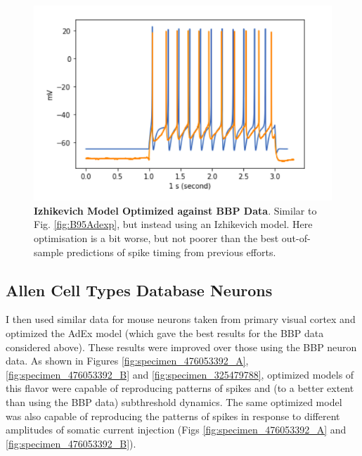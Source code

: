 \begin{figure}
    \centering
    \includegraphics{figures/IZHI_B95.png}
    \caption[Optimized Izhikevich Model from BBP]{\textbf{Izhikevich Model Optimized against BBP Data}. Similar to Fig. \ref{fig:B95Adexp}, but instead using an Izhikevich model.
    Here optimisation is a bit worse, but not poorer than the best out-of-sample predictions of spike timing from previous efforts.}
    \label{fig:B95_IZHI}
\end{figure}

\subsection{Allen Cell Types Database Neurons}
I then used similar data for mouse neurons taken from primary visual cortex and optimized the AdEx model (which gave the best results for the BBP data considered above).
These results were improved over those using the BBP neuron data.
As shown in Figures \ref{fig:specimen_476053392_A}, \ref{fig:specimen_476053392_B} and \ref{fig:specimen_325479788}, optimized models of this flavor were capable of reproducing patterns of spikes and (to a better extent than using the BBP data) subthreshold dynamics.
The same optimized model was also capable of reproducing the patterns of spikes in response to different amplitudes of somatic current injection (Figs \ref{fig:specimen_476053392_A} and \ref{fig:specimen_476053392_B}).

